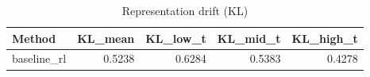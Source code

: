 \begin{table}[htbp]
\centering
\caption{Representation drift (KL)}
\label{tab:repr-drift}
\begin{tabular}{lrrrr}
\toprule
\textbf{Method} & \textbf{KL\_mean} & \textbf{KL\_low\_t} & \textbf{KL\_mid\_t} & \textbf{KL\_high\_t} \\
\midrule
baseline\_rl & 0.5238 & 0.6284 & 0.5383 & 0.4278 \\
\bottomrule
\end{tabular}
\end{table}